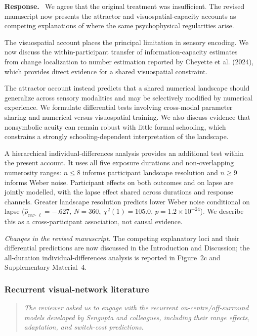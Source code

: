 \documentclass[11pt]{article}
\newenvironment{reviewercomment}{\begin{quote}\color{reviewgray}\itshape}{\end{quote}}
\newenvironment{authorresponse}{\par\noindent\textbf{\color{responseblue}Response.}\ }{\par}
\newcommand{\change}[1]{\par\noindent\textit{Changes in the revised manuscript.} #1\par}
\begin{document}
\begin{authorresponse}
We agree that the original treatment was insufficient. The revised manuscript now presents the attractor and visuospatial-capacity accounts as competing explanations of where the same psychophysical regularities arise.

The visuospatial account places the principal limitation in sensory encoding. We now discuss the within-participant transfer of information-capacity estimates from change localization to number estimation reported by Cheyette et al. (2024), which provides direct evidence for a shared visuospatial constraint.

The attractor account instead predicts that a shared numerical landscape should generalize across sensory modalities and may be selectively modified by numerical experience. We formulate differential tests involving cross-modal parameter sharing and numerical versus visuospatial training. We also discuss evidence that nonsymbolic acuity can remain robust with little formal schooling, which constrains a strongly schooling-dependent interpretation of the landscape.

A hierarchical individual-differences analysis provides an additional test within the present account. It uses all five exposure durations and non-overlapping numerosity ranges: $n\leq8$ informs participant landscape resolution and $n\geq9$ informs Weber noise. Participant effects on both outcomes and on lapse are jointly modelled, with the lapse effect shared across durations and response channels. Greater landscape resolution predicts lower Weber noise conditional on lapse ($\hat\rho_{nw\cdot\ell}=-.627$, $N=360$, $\chi^2(1)=105.0$, $p=1.2\times10^{-24}$). We describe this as a cross-participant association, not causal evidence.
\end{authorresponse}

\change{The competing explanatory loci and their differential predictions are now discussed in the Introduction and Discussion; the all-duration individual-differences analysis is reported in Figure~2c and Supplementary Material~4.}

\subsubsection*{Recurrent visual-network literature}

\begin{reviewercomment}
The reviewer asked us to engage with the recurrent on-centre/off-surround models developed by Sengupta and colleagues, including their range effects, adaptation, and switch-cost predictions.
\end{reviewercomment}
\end{document}
